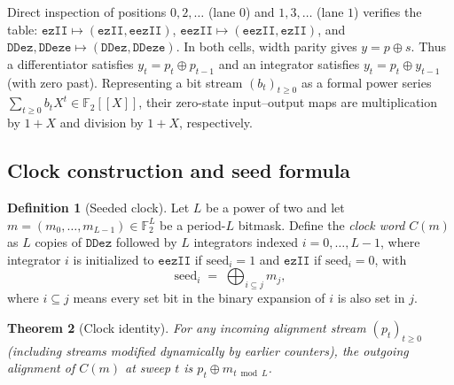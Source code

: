 \documentclass{article}
\newtheorem{theorem}{Theorem}
\theoremstyle{definition}
\newtheorem{definition}[theorem]{Definition}
\theoremstyle{remark}
\newcommand{\Ftwo}{\mathbb{F}_2}
\newcommand{\ttw}[1]{\texttt{#1}}
\begin{document}
Direct inspection of positions $0,2,\ldots$ (lane $0$) and $1,3,\ldots$ (lane $1$) verifies the table:
$\ttw{ezII} \mapsto (\ttw{ezII}, \ttw{eezII})$,
$\ttw{eezII} \mapsto (\ttw{eezII}, \ttw{ezII})$,
and $\ttw{DDez}, \ttw{DDeze} \mapsto (\ttw{DDez}, \ttw{DDeze})$.
In both cells, width parity gives $y = p \oplus s$.
Thus a differentiator satisfies $y_t = p_t \oplus p_{t-1}$ and an integrator satisfies $y_t = p_t \oplus y_{t-1}$ (with zero past).
Representing a bit stream $(b_t)_{t \ge 0}$ as a formal power series $\sum_{t \ge 0} b_t X^t \in \Ftwo[[X]]$, their zero-state input--output maps are multiplication by $1+X$ and division by $1+X$, respectively.

\subsection{Clock construction and seed formula}

\begin{definition}[Seeded clock]\label{def:clock}
Let $L$ be a power of two and let $m = (m_0, \ldots, m_{L-1}) \in \Ftwo^L$ be a period-$L$ bitmask.
Define the \emph{clock word} $C(m)$ as $L$ copies of $\ttw{DDez}$ followed by $L$ integrators indexed $i = 0, \ldots, L-1$, where integrator $i$ is initialized to $\ttw{eezII}$ if $\mathrm{seed}_i = 1$ and $\ttw{ezII}$ if $\mathrm{seed}_i = 0$, with
\begin{equation}\label{eq:seed}
\mathrm{seed}_i \;=\; \bigoplus_{i \subseteq j} m_j,
\end{equation}
where $i \subseteq j$ means every set bit in the binary expansion of $i$ is also set in $j$.
\end{definition}

\begin{theorem}[Clock identity]\label{thm:clock}
For any incoming alignment stream $(p_t)_{t \ge 0}$ (including streams modified dynamically by earlier counters), the outgoing alignment of $C(m)$ at sweep $t$ is $p_t \oplus m_{t \bmod L}$.
\end{theorem}
\end{document}
